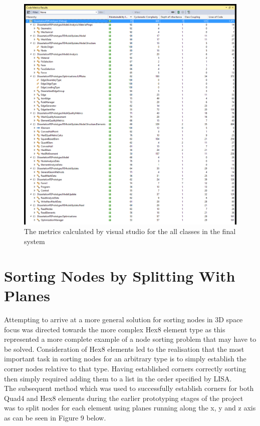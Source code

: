 \begin{figure}[H]
  \centerline{\includegraphics[width=165mm, scale=0.5]{../Graphics/qualityMetricsExpanded.png}}
  \caption{The metrics calculated by visual studio for the all classes in the final system}
\end{figure}

\newpage
\section{Sorting Nodes by Splitting With Planes}
\noindent
Attempting to arrive at a more general solution for sorting nodes in 3D space focus was directed towards the more complex Hex8 element type as this represented a more complete example of a node sorting problem that may have to be solved. Consideration of Hex8 elements led to the realisation that the most important task in sorting nodes for an arbitrary type is to simply establish the corner nodes relative to that type. Having established corners correctly sorting then simply required adding them to a list in the order specified by LISA. \\

\noindent
The subsequent method which was used to successfully establish corners for both Quad4 and Hex8 elements during the earlier prototyping stages of the project was to split nodes for each element using planes running along the x, y and z axis as can be seen in Figure 9 below.

